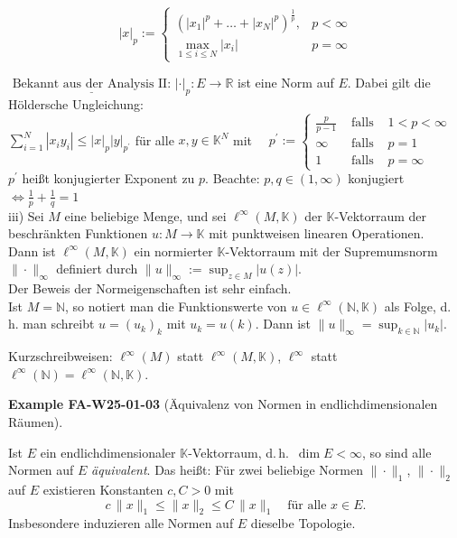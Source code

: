 \documentclass[10pt, letterpaper]{article}
\newcommand{\CustomHeading}[3]{%
  \par\medskip\noindent%
  \textbf{#1 #2} \textnormal{(#3)}.\enskip%
}
\newenvironment{EXA}[2]{\begin{unitbox}\CustomHeading{Example}{#1}{#2}}{\end{unitbox}}
\begin{document}
$$
|x|_{p}:= \begin{cases}\left(\left|x_{1}\right|^{p}+\ldots+\left|x_{N}\right|^{p}\right)^{\frac{1}{p}}, & p<\infty \\ \max _{1 \leq i \leq N}\left|x_{i}\right| & p=\infty\end{cases}
$$

$\underline{\text { Bekannt aus der Analysis II: }}|\cdot|_{p}: E \rightarrow \mathbb{R}$ ist eine Norm auf $E$. Dabei gilt die Höldersche Ungleichung:\\
$\sum_{i=1}^{N}\left|x_{i} y_{i}\right| \leq|x|_{p}|y|_{p^{\prime}}$ für alle $x, y \in \mathbb{K}^{N}$ mit $\quad p^{\prime}:=\left\{\begin{array}{lll}\frac{p}{p-1} & \text { falls } & 1<p<\infty \\ \infty & \text { falls } & p=1 \\ 1 & \text { falls } & p=\infty\end{array}\right.$\\
$p^{\prime}$ heißt konjugierter Exponent zu $p$. Beachte: $p, q \in(1, \infty)$ konjugiert $\Longleftrightarrow \frac{1}{p}+\frac{1}{q}=1$\\
iii) Sei $M$ eine beliebige Menge, und sei $\ell^{\infty}(M, \mathbb{K})$ der $\mathbb{K}$-Vektorraum der beschränkten Funktionen $u: M \rightarrow \mathbb{K}$ mit punktweisen linearen Operationen.\\
Dann ist $\ell^{\infty}(M, \mathbb{K})$ ein normierter $\mathbb{K}$-Vektorraum mit der Supremumsnorm $\|\cdot\|_{\infty}$ definiert durch $\|u\|_{\infty}:=\sup _{z \in M}|u(z)|$.\\
Der Beweis der Normeigenschaften ist sehr einfach.\\
Ist $M=\mathbb{N}$, so notiert man die Funktionswerte von $u \in \ell^{\infty}(\mathbb{N}, \mathbb{K})$ als Folge, d. h. man schreibt $u=\left(u_{k}\right)_{k}$ mit $u_{k}=u(k)$. Dann ist $\|u\|_{\infty}=\sup _{k \in \mathbb{N}}\left|u_{k}\right|$.

Kurzschreibweisen: $\ell^{\infty}(M)$ statt $\ell^{\infty}(M, \mathbb{K})$, $\ell^{\infty}$ statt $\ell^{\infty}(\mathbb{N})=\ell^{\infty}(\mathbb{N}, \mathbb{K})$.






\begin{EXA}{FA-W25-01-03}{Äquivalenz von Normen in endlichdimensionalen Räumen}
Ist $E$ ein endlichdimensionaler $\mathbb{K}$-Vektorraum, d.\,h.\ $\dim E<\infty$, so sind alle Normen auf $E$ \emph{äquivalent}.  
Das heißt: Für zwei beliebige Normen $\|\cdot\|_1$, $\|\cdot\|_2$ auf $E$ existieren Konstanten $c,C>0$ mit
\[
c\,\|x\|_1 \le \|x\|_2 \le C\,\|x\|_1
\quad\text{für alle }x\in E.
\]
Insbesondere induzieren alle Normen auf $E$ dieselbe Topologie.
\end{EXA}
\end{document}

